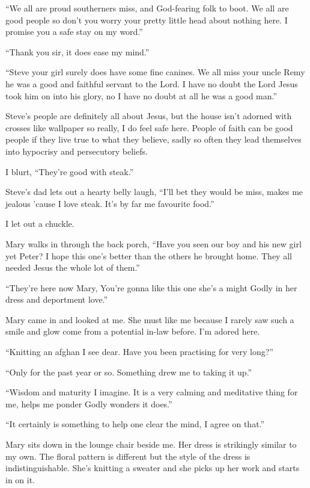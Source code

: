 ``We all are proud southerners miss, and God-fearing folk to boot. We all are good people so don't you worry your pretty little head about nothing here. I promise you a safe stay on my word.''

``Thank you sir, it does ease my mind.''

``Steve your girl surely does have some fine canines. We all miss your uncle Remy he was a good and faithful servant to the Lord. I have no doubt the Lord Jesus took him on into his glory, no I have no doubt at all he was a good man.''

Steve's people are definitely all about Jesus, but the house isn't adorned with crosses like wallpaper so really, I do feel safe here. People of faith can be good people if they live true to what they believe, sadly so often they lead themselves into hypocrisy and persecutory beliefs.

I blurt, ``They're good with steak.''

Steve's dad lets out a hearty belly laugh, ``I'll bet they would be miss, makes me jealous 'cause I love steak. It's by far me favourite food.''

I let out a chuckle.

Mary walks in through the back porch, ``Have you seen our boy and his new girl yet Peter? I hope this one's better than the others he brought home. They all needed Jesus the whole lot of them.''

``They're here now Mary, You're gonna like this one she's a might Godly in her dress and deportment love.''

Mary came in and looked at me. She must like me because I rarely saw such a smile and glow come from a potential in-law before. I'm adored here.

``Knitting an afghan I see dear. Have you been practising for very long?''

``Only for the past year or so. Something drew me to taking it up.''

``Wisdom and maturity I imagine. It is a very calming and meditative thing for me, helps me ponder Godly wonders it does.''

``It certainly is something to help one clear the mind, I agree on that.''

Mary sits down in the lounge chair beside me. Her dress is strikingly similar to my own. The floral pattern is different but the style of the dress is indistinguishable. She's knitting a sweater and she picks up her work and starts in on it.

